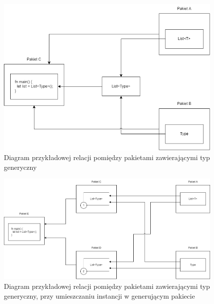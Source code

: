 \begin{figure}
	\caption{Diagram przykładowej relacji pomiędzy pakietami zawierającymi typ generyczny}
	\label{generic_packages_dependencies}
	\begin{center}
		\includegraphics[width=\textwidth]{img/generic_misplaced.png}
	\end{center}
\end{figure}

\begin{figure}
	\caption{Diagram przykładowej relacji pomiędzy pakietami zawierającymi typ generyczny, przy umieszczaniu instancji w generującym pakiecie}
	\label{generic_packages_dependencies:option:a}
	\begin{center}
		\includegraphics[width=\textwidth]{img/generics_placed_in_a.png}
	\end{center}
\end{figure}

